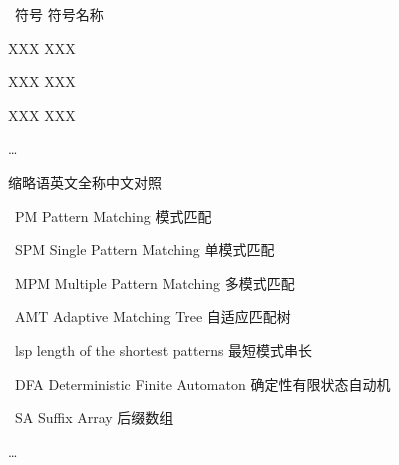 \XDUpremainmatter

\begin{symbollist}
\item ~符号 \hspace{12em} 符号名称
\item XXX \hspace{12.5em} XXX
\item XXX \hspace{12.5em} XXX
\item XXX \hspace{12.5em} XXX
\item \ldots
\end{symbollist}

\begin{abbreviationlist}
\item 缩略语\hspace{6em}英文全称\hspace{6em}中文对照
\item ~PM Pattern Matching 模式匹配
\item ~SPM Single Pattern Matching 单模式匹配
\item ~MPM  Multiple Pattern Matching 多模式匹配
\item ~AMT Adaptive Matching Tree 自适应匹配树
\item ~lsp length of the shortest patterns  最短模式串长
\item ~DFA Deterministic Finite Automaton  确定性有限状态自动机
\item ~SA Suffix Array 后缀数组

\item \ldots
\end{abbreviationlist}
